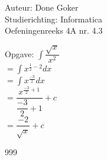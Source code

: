 \documentclass[a4paper]{article}
\begin{document}
  
\noindent \large Auteur: Done Goker \\
\noindent \large Studierichting: Informatica\\
\noindent \large Oefeningenreeks 4A nr. 4.3\\

\medskip

\normalsize

Opgave:
$\displaystyle\int \dfrac{\sqrt{x}}{x^2}$ \\

$= \displaystyle\int x^{\tfrac{1}{2} -2} dx$ \\

$= \displaystyle\int x^{\tfrac{-3}{2}} dx$ \\ 

$= \dfrac{x^{\tfrac{-3}{2} + 1}}{\dfrac{-3}{2} + 1} + c$ \\

$= \dfrac{-2}{\sqrt{x}} + c$
\begin{thebibliography}{999}
\end{thebibliography}
\end{document}
